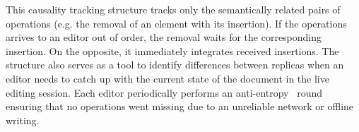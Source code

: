This causality tracking structure tracks only the semantically related pairs of
operations (e.g. the removal of an element with its insertion). If the
operations arrives to an editor out of order, the removal waits for the
corresponding insertion. On the opposite, it immediately integrates received
insertions.
The structure also serves as a tool to identify differences between replicas
when an editor needs to catch up with the current state of the document in the
live editing session.  Each editor periodically performs an
anti-entropy~\cite{demers1987epidemic} round ensuring that no operations went
missing due to an unreliable network or offline writing.

%   




